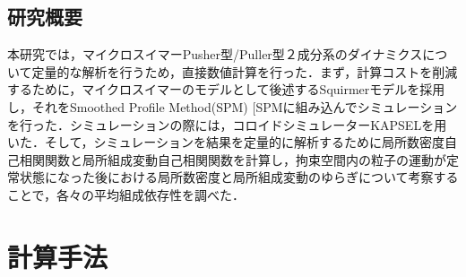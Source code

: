 \documentclass[11pt,a4j]{jarticle}
\makeatletter
\DeclareRobustCommand\cite{\unskip
\@ifnextchar[{\@tempswatrue\@citex}{\@tempswafalse\@citex[]}}
\makeatother
\begin{document}
\subsection{研究概要}
\par 本研究では，マイクロスイマーPusher型/Puller型２成分系のダイナミクスについて定量的な解析を行うため，直接数値計算を行った．まず，計算コストを削減するために，マイクロスイマーのモデルとして後述するSquirmerモデルを採用し，それをSmoothed Profile Method(SPM)\cite{SPM}に組み込んでシミュレーションを行った．シミュレーションの際には，コロイドシミュレーターKAPSELを用いた．そして，シミュレーションを結果を定量的に解析するために局所数密度自己相関関数と局所組成変動自己相関関数を計算し，拘束空間内の粒子の運動が定常状態になった後における局所数密度と局所組成変動のゆらぎについて考察することで，各々の平均組成依存性を調べた．

\newpage
\section{計算手法}
\end{document}
